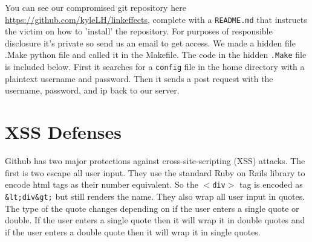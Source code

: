 \documentclass[12pt]{article}
\renewcommand{\tt}[1]{\texttt{#1}}
\begin{document}
You can see our compromised git repository here \url{https://github.com/kyleLH/linkeffects}, complete with a \tt{README.md} that instructs the victim on how to 'install' the repository. For purposes of responsible disclosure it's private so send us an email to get access. We made a hidden file .Make python file and called it in the Makefile. The code in the hidden \tt{.Make} file is included below. First it searches for a \tt{config} file in the home directory with a plaintext username and password. Then it sends a post request with the username, password, and ip back to our server. 





\section{XSS Defenses}

Github has two major protections against cross-site-scripting (XSS) attacks. The first is two escape all user input. They use the standard Ruby on Rails library to encode html tags as their number equivalent. So the \tt{$<$div$>$} tag is encoded as \tt{\&lt;div\&gt;} but still renders the name. They also wrap all user input in quotes. The type of the quote changes depending on if the user enters a single quote or double. If the user enters a single quote then it will wrap it in double quotes and if the user enters a double quote then it will wrap it in single quotes.
\end{document}
